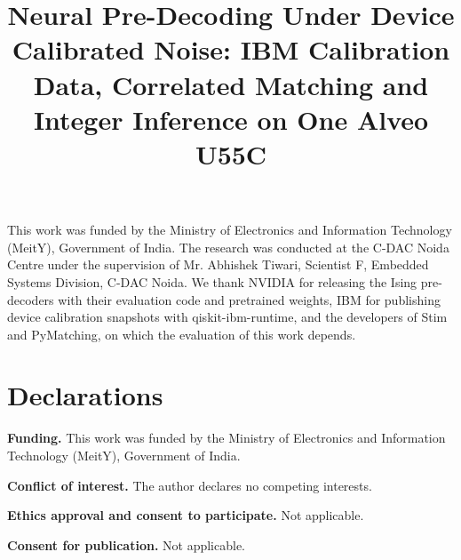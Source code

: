 \documentclass[pdflatex,sn-mathphys-num]{sn-jnl}
\begin{document}
\title[Calibration Aware Neural Pre-Decoding on One FPGA]{Neural Pre-Decoding Under Device Calibrated Noise:
IBM Calibration Data, Correlated Matching and Integer Inference on One Alveo U55C}

\author*[1]{ }


\abstract{}


\maketitle








\backmatter

This work was funded by the Ministry of Electronics and Information Technology (MeitY), Government of India. The
research was conducted at the C-DAC Noida Centre under the supervision of Mr. Abhishek Tiwari, Scientist F, Embedded
Systems Division, C-DAC Noida. We thank NVIDIA for releasing the Ising pre-decoders with their evaluation code and
pretrained weights, IBM for publishing device calibration snapshots with qiskit-ibm-runtime, and the developers of
Stim and PyMatching, on which the evaluation of this work depends.

\section*{Declarations}

\textbf{Funding.} This work was funded by the Ministry of Electronics and Information Technology (MeitY), Government of
India.

\textbf{Conflict of interest.} The author declares no competing interests.

\textbf{Ethics approval and consent to participate.} Not applicable.

\textbf{Consent for publication.} Not applicable.
\end{document}
